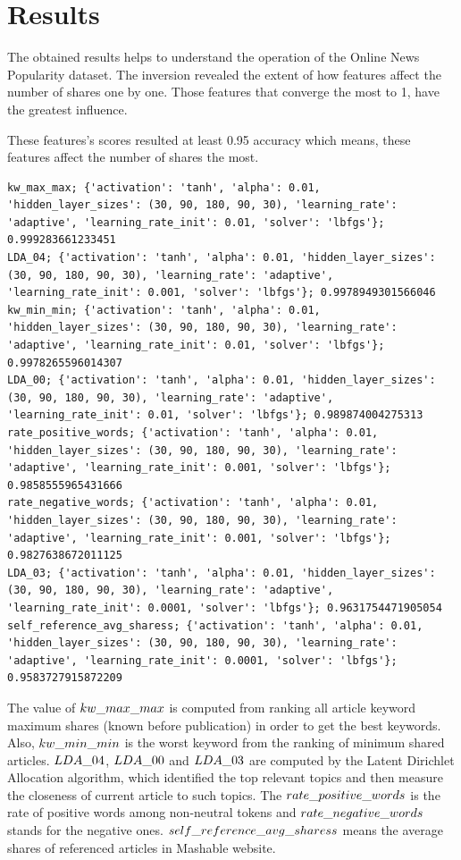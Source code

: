 \section{Results}

The obtained results helps to understand the operation of the Online News Popularity dataset. The inversion revealed the extent of how features affect the number of shares one by one. Those features that converge the most to 1, have the greatest influence.\medskip

These features's scores resulted at least 0.95 accuracy which means, these features affect the number of shares the most.
\begin{lstlisting}
kw_max_max; {'activation': 'tanh', 'alpha': 0.01, 'hidden_layer_sizes': (30, 90, 180, 90, 30), 'learning_rate': 'adaptive', 'learning_rate_init': 0.01, 'solver': 'lbfgs'}; 0.999283661233451
LDA_04; {'activation': 'tanh', 'alpha': 0.01, 'hidden_layer_sizes': (30, 90, 180, 90, 30), 'learning_rate': 'adaptive', 'learning_rate_init': 0.001, 'solver': 'lbfgs'}; 0.9978949301566046
kw_min_min; {'activation': 'tanh', 'alpha': 0.01, 'hidden_layer_sizes': (30, 90, 180, 90, 30), 'learning_rate': 'adaptive', 'learning_rate_init': 0.01, 'solver': 'lbfgs'}; 0.9978265596014307
LDA_00; {'activation': 'tanh', 'alpha': 0.01, 'hidden_layer_sizes': (30, 90, 180, 90, 30), 'learning_rate': 'adaptive', 'learning_rate_init': 0.01, 'solver': 'lbfgs'}; 0.989874004275313
rate_positive_words; {'activation': 'tanh', 'alpha': 0.01, 'hidden_layer_sizes': (30, 90, 180, 90, 30), 'learning_rate': 'adaptive', 'learning_rate_init': 0.001, 'solver': 'lbfgs'}; 0.9858555965431666
rate_negative_words; {'activation': 'tanh', 'alpha': 0.01, 'hidden_layer_sizes': (30, 90, 180, 90, 30), 'learning_rate': 'adaptive', 'learning_rate_init': 0.001, 'solver': 'lbfgs'}; 0.9827638672011125
LDA_03; {'activation': 'tanh', 'alpha': 0.01, 'hidden_layer_sizes': (30, 90, 180, 90, 30), 'learning_rate': 'adaptive', 'learning_rate_init': 0.0001, 'solver': 'lbfgs'}; 0.9631754471905054
self_reference_avg_sharess; {'activation': 'tanh', 'alpha': 0.01, 'hidden_layer_sizes': (30, 90, 180, 90, 30), 'learning_rate': 'adaptive', 'learning_rate_init': 0.0001, 'solver': 'lbfgs'}; 0.9583727915872209
\end{lstlisting}
The value of $kw\char`_max\char`_max$ is computed from ranking all article keyword maximum shares (known before publication) in order to get the best keywords. Also, $kw\char`_min\char`_min$ is the worst keyword from the ranking of minimum shared articles. $LDA\char`_04$, $LDA\char`_00$ and $LDA\char`_03$ are computed by the Latent Dirichlet Allocation algorithm, which identified the top relevant topics and then measure the closeness of current article to such topics. The $rate\char`_positive\char`_words$ is the rate of positive words among non-neutral tokens and $rate\char`_negative\char`_words$ stands for the negative ones. $self\char`_reference\char`_avg\char`_sharess$ means the average shares of referenced articles in Mashable website.

